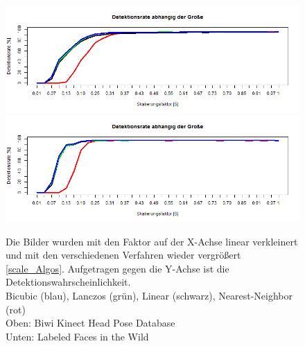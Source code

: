 \begin{figure}
	\centering
	\includegraphics[width=\linewidth]{img_Skalierung/Resize_Rate_Ges}\\
	\includegraphics[width=\linewidth]{img_Skalierung/Resize_Rate_lfw}
	\caption{Die Bilder wurden mit den Faktor auf der X-Achse linear verkleinert und mit den verschiedenen Verfahren wieder vergrößert \autoref{scale_Algos}. Aufgetragen gegen die Y-Achse ist die  Detektionswahrscheinlichkeit.\\
	Bicubic (blau), Lanczos (grün), Linear (schwarz), Nearest-Neighbor (rot)\\
	Oben: Biwi Kinect Head Pose Database \cite{BIWI_database}\\
	Unten: Labeled Faces in the Wild\cite{database_Face}}
	\label{img_hochskalliern}
\end{figure}
